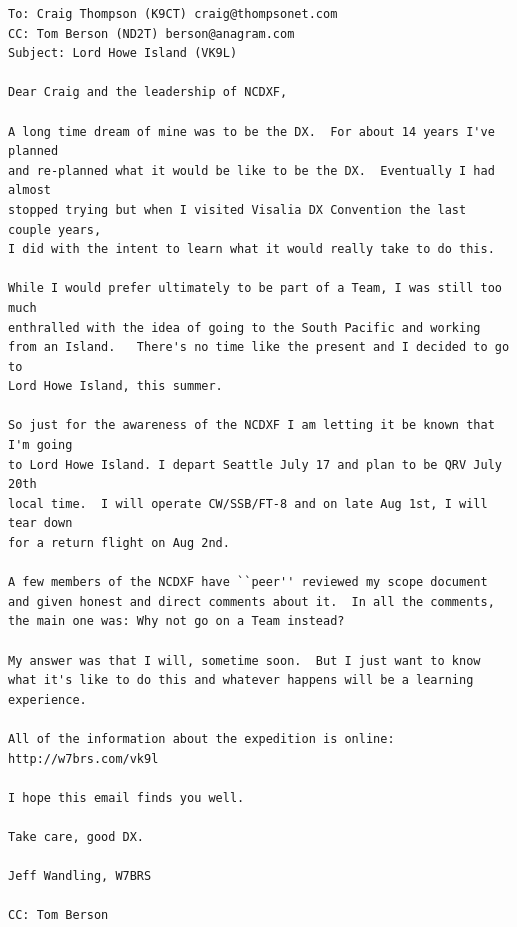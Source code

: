 \documentclass[11pt]{article}
\begin{document}
\begin{Verbatim}[fontsize=\small]
To: Craig Thompson (K9CT) craig@thompsonet.com
CC: Tom Berson (ND2T) berson@anagram.com
Subject: Lord Howe Island (VK9L)

Dear Craig and the leadership of NCDXF,

A long time dream of mine was to be the DX.  For about 14 years I've planned
and re-planned what it would be like to be the DX.  Eventually I had almost
stopped trying but when I visited Visalia DX Convention the last couple years,
I did with the intent to learn what it would really take to do this.

While I would prefer ultimately to be part of a Team, I was still too much
enthralled with the idea of going to the South Pacific and working
from an Island.   There's no time like the present and I decided to go to
Lord Howe Island, this summer.

So just for the awareness of the NCDXF I am letting it be known that I'm going
to Lord Howe Island. I depart Seattle July 17 and plan to be QRV July 20th
local time.  I will operate CW/SSB/FT-8 and on late Aug 1st, I will tear down
for a return flight on Aug 2nd.

A few members of the NCDXF have ``peer'' reviewed my scope document 
and given honest and direct comments about it.  In all the comments, 
the main one was: Why not go on a Team instead? 

My answer was that I will, sometime soon.  But I just want to know 
what it's like to do this and whatever happens will be a learning experience.

All of the information about the expedition is online:
http://w7brs.com/vk9l

I hope this email finds you well.

Take care, good DX.

Jeff Wandling, W7BRS

CC: Tom Berson
\end{Verbatim}
\end{document}
